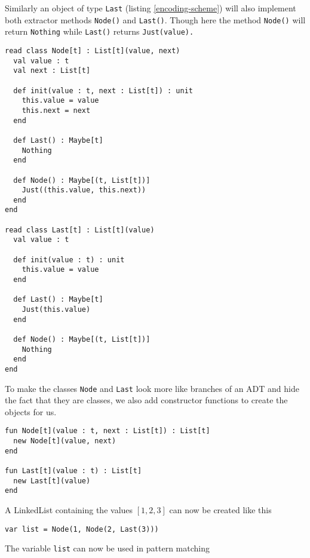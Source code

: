 \documentclass[10pt]{report}
\def\code#1{\texttt{#1}} %
\begin{document}
\par{Similarly an object of type \code{Last} (listing \ref{encoding-scheme}) will also implement both extractor methods \code{Node()} and \code{Last()}. Though here the method \code{Node()} will return \code{Nothing} while \code{Last()} returns \code{Just(value).}}

\begin{lstlisting}[language=encore,caption={Implementation of Node and Last classes},label=encoding-scheme]
read class Node[t] : List[t](value, next)
  val value : t
  val next : List[t]

  def init(value : t, next : List[t]) : unit
    this.value = value
    this.next = next
  end

  def Last() : Maybe[t]
    Nothing
  end

  def Node() : Maybe[(t, List[t])]
    Just((this.value, this.next))
  end
end

read class Last[t] : List[t](value)
  val value : t

  def init(value : t) : unit
    this.value = value
  end

  def Last() : Maybe[t]
    Just(this.value)
  end

  def Node() : Maybe[(t, List[t])]
    Nothing
  end
end
\end{lstlisting}

\par{To make the classes \code{Node} and \code{Last} look more like branches of an ADT and hide the fact that they are classes, we also add constructor functions to create the objects for us.}

\begin{lstlisting}[language=encore,caption={Constructor functions for Node and Last}]
fun Node[t](value : t, next : List[t]) : List[t]
  new Node[t](value, next)
end

fun Last[t](value : t) : List[t]
  new Last[t](value)
end
\end{lstlisting}

\par{A LinkedList containing the values $[1, 2, 3]$ can now be created like this}
\begin{lstlisting}[language=encore,caption={Creation of list containing three elements}]
var list = Node(1, Node(2, Last(3)))
\end{lstlisting}

\par{The variable \code{list} can now be used in pattern matching}
\end{document}
